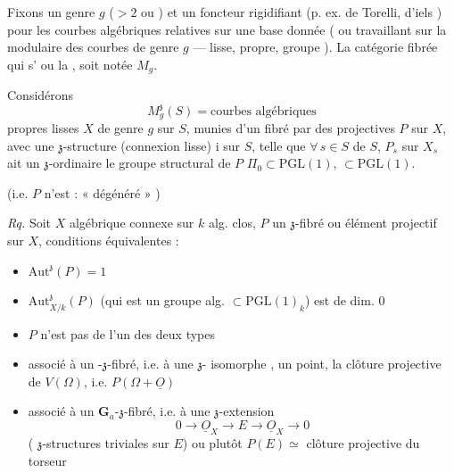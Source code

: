 \documentclass[11pt,a4paper]{article}
\begin{document}
Fixons \ill{} un genre $g$ ($> 2$ ou \ill{}) et un foncteur rigidifiant
(p. ex. de Torelli, d'i\ill{}els ) pour les courbes
algébriques \ill{} relatives sur une base donnée (\ill{} ou travaillant sur
la \struck{\ill{}}  \ill{} modulaire des courbes de
genre $g$ --- lisse, propre, groupe \ill{}). La catégorie fibrée qui s'\ill{}
ou la \ill{} \ill{}, soit notée $M_g$.

Considérons
\[
  M_g^{\mathfrak{z}}(S) = \text{courbes algébriques}
\]
propres lisses $X$ de genre $g$ sur $S$, munies d'un \ill{} fibré par des
\ill{} projectives $P$ sur $X$, avec une $\mathfrak{z}$-structure (connexion
lisse) i\ill{} sur $S$, telle que $\forall\, s \in S$ \ill{} de $S$,
$P_s$ sur $X_s$ ait un  $\mathfrak{z}$-ordinaire
\ill{} le groupe structural de $P$ \ill{} $\Pi_0 \subset \mathrm{PGL}(1)$,
\ill{} $\subset \mathrm{PGL}(1)$.

(i.e. $P$ n'est  : \ill{} « dégénéré » \ill{})

\emph{Rq.} Soit $X$   algébrique connexe sur
$k$ alg. clos, \struck{\ill{}} $P$ un $\mathfrak{z}$-fibré ou élément
projectif sur $X$, conditions équivalentes :
\begin{itemize}
  \item[a)] $\mathrm{Aut}^{\mathfrak{z}}(P) = 1$
  \item[b)] $\mathrm{Aut}^{\mathfrak{z}}_{X/k}(P)$ (qui est un groupe alg.
  $\subset \mathrm{PGL}(1)_k$) est de dim. $0$
  \item[c)] $P$ n'est pas de l'un des deux types
\end{itemize}
\begin{itemize}
  \item[$\alpha$)] associé à un \ill{}-$\mathfrak{z}$-fibré, i.e. à une
  $\mathfrak{z}$-\ill{} isomorphe \struck{\ill{}}, un point, la clôture
  projective de $V(\Omega)$, i.e. $P(\Omega + \underline{O})$
  \item[$\beta$)] associé à un $\mathbf{G}_a$-$\mathfrak{z}$-fibré, i.e. à
  une $\mathfrak{z}$-extension
  \[
    0 \longrightarrow \underline{O}_X \longrightarrow E \longrightarrow
    \underline{O}_X \longrightarrow 0
  \]
  (\ill{} $\mathfrak{z}$-structures triviales sur $E$) ou plutôt
  $P(E) \simeq$ clôture projective du torseur \ill{}
\end{itemize}
\end{document}
